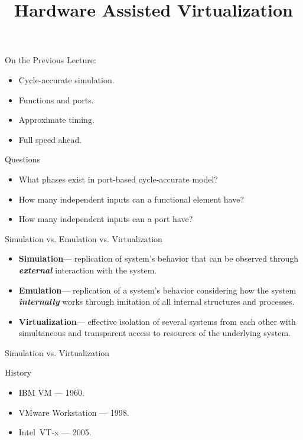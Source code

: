 
\title{Hardware Assisted Virtualization}



\startslides

\begin{frame}{On the Previous Lecture:}
  \begin{itemize}
    \item Cycle-accurate simulation.
    \item Functions and ports.
    \item Approximate timing.
    \item Full speed ahead.
  \end{itemize}
\end{frame}

\begin{frame}{Questions}
  \begin{itemize}
    \item What phases exist in port-based cycle-accurate model?\pause
    \item How many independent inputs can a functional element have?\pause
    \item How many independent inputs can a port have?
  \end{itemize}
\end{frame}

\begin{frame}{Simulation vs. Emulation vs. Virtualization}
\begin{itemize}
\item \textbf{Simulation}\pause --- replication of system's behavior that can
  be observed through \textbf{\textit{external}} interaction with the system.
\item \textbf{Emulation}\pause --- replication of a system's behavior
  considering how the system \textbf{\textit{internally}} works through
  imitation of all internal structures and processes.
\item \textbf{Virtualization}\pause --- effective isolation of several systems
  from each other with simultaneous and transparent access to resources of the
  underlying system.
\end{itemize}
\end{frame}

\begin{frame}{Simulation vs. Virtualization}
\centering
{}
\vfill
{}
\end{frame}

\begin{frame}{History}
\begin{itemize}
\item IBM VM --- 1960.
\item VMware Workstation --- 1998.
\item Intel\reg~VT-x --- 2005.
\end{itemize}
\end{frame}

